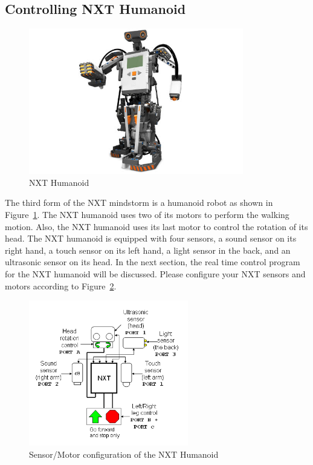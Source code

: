 \documentclass[11pt]{article}
\begin{document}
\clearpage
\newpage
\subsection{Controlling NXT Humanoid}
\begin{figure}[ht]
  \begin{center}
    \includegraphics[height=2.5in]{figure/mindstorm/NXT_humanoid.png}
    \caption{NXT Humanoid \label{fig_NXT_humanoid}}
  \end{center}
\end{figure}
The third form of the NXT mindstorm is a humanoid robot as shown in 
Figure~\ref{fig_NXT_humanoid}. The NXT humanoid uses two of its motors to 
perform the walking motion. Also, the NXT humanoid uses its last motor to 
control the rotation of its head. The NXT humanoid is equipped with four 
sensors, a sound sensor on its right hand, a touch sensor on its left hand, a 
light sensor in the back, and an ultrasonic sensor on its head. In the next 
section, the real time control program for the NXT humanoid will be discussed. 
Please configure your NXT sensors and motors according to Figure~\ref{fig_NXT_human_port}.
\begin{figure}[ht]
  \begin{center}
    \includegraphics[height=2.5in]{figure/mindstorm/NXT_human_port.png}
    \caption{Sensor/Motor configuration of the NXT Humanoid
    \label{fig_NXT_human_port}}
  \end{center}
\end{figure}
\end{document}
